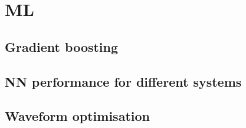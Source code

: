 \chapter{ML}


\section{Gradient boosting}



\section{NN performance for different systems}

\lipsum[1]

\section{Waveform optimisation}

\lipsum[1]

